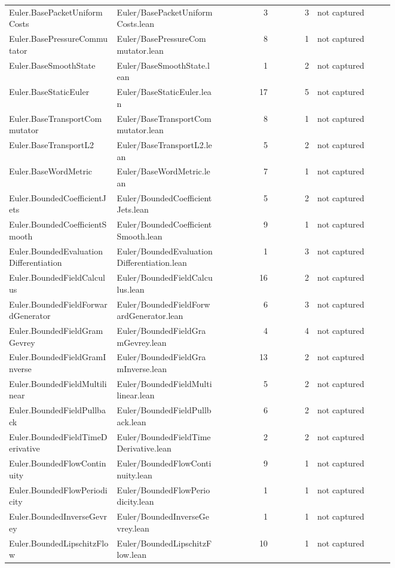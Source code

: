 \documentclass[10pt]{article}
\begin{document}
\begin{longtable}{p{0.28\linewidth}p{0.27\linewidth}r r p{0.20\linewidth}}
Euler.BasePacketUniformCosts & Euler/BasePacketUniformCosts.lean & 3 & 3 & not captured\\
Euler.BasePressureCommutator & Euler/BasePressureCommutator.lean & 8 & 1 & not captured\\
Euler.BaseSmoothState & Euler/BaseSmoothState.lean & 1 & 2 & not captured\\
Euler.BaseStaticEuler & Euler/BaseStaticEuler.lean & 17 & 5 & not captured\\
Euler.BaseTransportCommutator & Euler/BaseTransportCommutator.lean & 8 & 1 & not captured\\
Euler.BaseTransportL2 & Euler/BaseTransportL2.lean & 5 & 2 & not captured\\
Euler.BaseWordMetric & Euler/BaseWordMetric.lean & 7 & 1 & not captured\\
Euler.BoundedCoefficientJets & Euler/BoundedCoefficientJets.lean & 5 & 2 & not captured\\
Euler.BoundedCoefficientSmooth & Euler/BoundedCoefficientSmooth.lean & 9 & 1 & not captured\\
Euler.BoundedEvaluationDifferentiation & Euler/BoundedEvaluationDifferentiation.lean & 1 & 3 & not captured\\
Euler.BoundedFieldCalculus & Euler/BoundedFieldCalculus.lean & 16 & 2 & not captured\\
Euler.BoundedFieldForwardGenerator & Euler/BoundedFieldForwardGenerator.lean & 6 & 3 & not captured\\
Euler.BoundedFieldGramGevrey & Euler/BoundedFieldGramGevrey.lean & 4 & 4 & not captured\\
Euler.BoundedFieldGramInverse & Euler/BoundedFieldGramInverse.lean & 13 & 2 & not captured\\
Euler.BoundedFieldMultilinear & Euler/BoundedFieldMultilinear.lean & 5 & 2 & not captured\\
Euler.BoundedFieldPullback & Euler/BoundedFieldPullback.lean & 6 & 2 & not captured\\
Euler.BoundedFieldTimeDerivative & Euler/BoundedFieldTimeDerivative.lean & 2 & 2 & not captured\\
Euler.BoundedFlowContinuity & Euler/BoundedFlowContinuity.lean & 9 & 1 & not captured\\
Euler.BoundedFlowPeriodicity & Euler/BoundedFlowPeriodicity.lean & 1 & 1 & not captured\\
Euler.BoundedInverseGevrey & Euler/BoundedInverseGevrey.lean & 1 & 1 & not captured\\
Euler.BoundedLipschitzFlow & Euler/BoundedLipschitzFlow.lean & 10 & 1 & not captured\\

\end{longtable}
\end{document}
